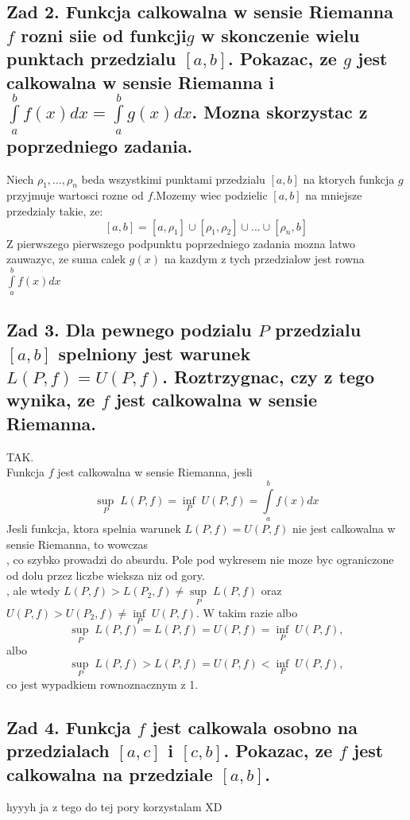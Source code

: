 \documentclass{article}
\begin{document}
\subsection*{Zad 2. Funkcja calkowalna w sensie Riemanna $f$ rozni siie od funkcji$g$ w skonczenie wielu punktach przedzialu $[a,b]$. Pokazac, ze $g$ jest calkowalna w sensie Riemanna i $\int\limits_a^b f(x)dx=\int\limits_a^bg(x)dx$. Mozna skorzystac z poprzedniego zadania.}
    Niech $\rho_1, ..., \rho_n$ beda wszystkimi punktami przedzialu $[a,b]$ na ktorych funkcja $g$ przyjmuje wartosci rozne od $f$.Mozemy wiec podzielic $[a,b]$ na mniejsze przedzialy takie, ze:
    $$[a,b]=[a, \rho_1]\cup[\rho_1, \rho_2]\cup...\cup[\rho_n, b]$$
    Z pierwszego pierwszego podpunktu poprzedniego zadania mozna latwo zauwazyc, ze suma calek $g(x)$ na kazdym z tych przedzialow jest rowna $\int\limits_a^bf(x)dx$
    \kondow
\subsection*{Zad 3. Dla pewnego podzialu $P$ przedzialu $[a,b]$ spelniony jest warunek $L(P,f)=U(P,f)$. Roztrzygnac, czy z tego wynika, ze $f$ jest calkowalna w sensie Riemanna.}
    TAK.\bigskip\\
    Funkcja $f$ jest calkowalna w sensie Riemanna, jesli
    $$\underset{P}\sup\; L(P, f)=\underset{P}\inf\; U(P, f)=\int\limits_a^bf(x)dx$$
    Jesli funkcja, ktora spelnia warunek $L(P,f)=U(P,f)$ nie jest calkowalna w sensie Riemanna, to wowczas\medskip\\
    , co szybko prowadzi do absurdu. Pole pod wykresem nie moze byc ograniczone od dolu przez liczbe wieksza niz od gory.\medskip\\
    , ale wtedy $L(P,f)>L(P_2, f)\neq \underset{P}\sup\;L(P,f)$ oraz $U(P,f)>U(P_2, f)\neq \underset{P}\inf\;U(P,f)$. W takim razie albo
    $$\underset{P}\sup\;L(P,f)=L(P,f)=U(P,f)=\underset{P}\inf\;U(P,f),$$
    albo
    $$\underset{P}\sup\;L(P,f)>L(P,f)=U(P,f)<\underset{P}\inf\;U(P,f),$$
    co jest wypadkiem rownoznacznym z 1.
    \kondow
\subsection*{Zad 4. Funkcja $f$ jest calkowala osobno na przedzialach $[a,c]$ i $[c, b]$. Pokazac, ze $f$ jest calkowalna na przedziale $[a,b]$.}
hyyyh ja z tego do tej pory korzystalam XD
\end{document}
